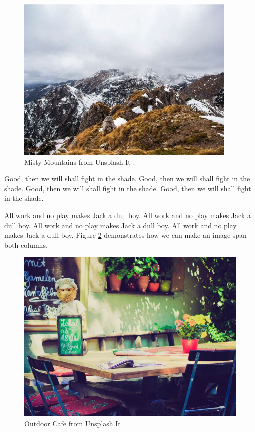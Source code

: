 \begin{figure}[h]
\centering
\includegraphics[width=\linewidth,natwidth=400,natheight=300]{../figures/mountains.jpg}
\caption{Misty Mountains from Unsplash It \cite{unsplash}.}
\label{fig:mountains}
\end{figure}

Good, then we will shall fight in the shade.
Good, then we will shall fight in the shade.
Good, then we will shall fight in the shade.
Good, then we will shall fight in the shade.

All work and no play makes Jack a dull boy.
All work and no play makes Jack a dull boy.
All work and no play makes Jack a dull boy.
All work and no play makes Jack a dull boy.
Figure \ref{fig:outdoor_cafe} demonstrates how we can make an image span both columns.

\begin{figure}[h]
\centering
\includegraphics[width=\textwidth,natwidth=800,natheight=600]{../figures/outdoor_cafe.jpg}
\caption{Outdoor Cafe from Unsplash It \cite{unsplash}.}
\label{fig:outdoor_cafe}
\end{figure}
